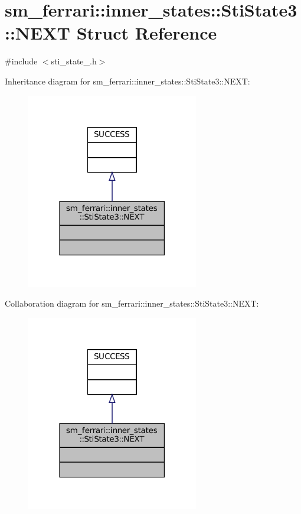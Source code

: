 \hypertarget{structsm__ferrari_1_1inner__states_1_1StiState3_1_1NEXT}{}\section{sm\+\_\+ferrari\+:\+:inner\+\_\+states\+:\+:Sti\+State3\+:\+:N\+E\+XT Struct Reference}
\label{structsm__ferrari_1_1inner__states_1_1StiState3_1_1NEXT}


{\ttfamily \#include $<$sti\+\_\+state\+\_.\+h$>$}



Inheritance diagram for sm\+\_\+ferrari\+:\+:inner\+\_\+states\+:\+:Sti\+State3\+:\+:N\+E\+XT\+:
\nopagebreak
\begin{figure}[H]
\begin{center}
\leavevmode
\includegraphics[width=213pt]{structsm__ferrari_1_1inner__states_1_1StiState3_1_1NEXT__inherit__graph}
\end{center}
\end{figure}


Collaboration diagram for sm\+\_\+ferrari\+:\+:inner\+\_\+states\+:\+:Sti\+State3\+:\+:N\+E\+XT\+:
\nopagebreak
\begin{figure}[H]
\begin{center}
\leavevmode
\includegraphics[width=213pt]{structsm__ferrari_1_1inner__states_1_1StiState3_1_1NEXT__coll__graph}
\end{center}
\end{figure}


